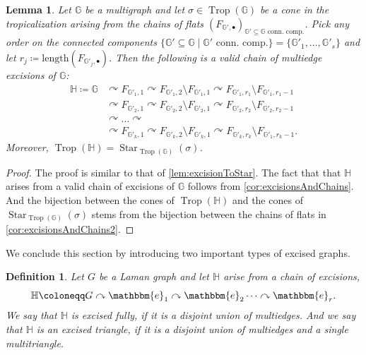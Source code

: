 \documentclass[11pt,reqno,a4paper]{amsart}
\theoremstyle{theoremstyle}
\newtheorem{lemma}[theorem]{Lemma}
\theoremstyle{examplestyle}
\newtheorem{definition}[theorem]{Definition}
\theoremstyle{algorithmstyle}
\newcommand{\ee}{\mathbbm{e}}
\newcommand{\GG}{\mathbb{G}}
\newcommand{\HH}{\mathbb{H}}
\DeclareMathOperator{\Trop}{Trop}
\DeclareMathOperator{\Star}{Star}
\begin{document}
\begin{lemma}
  \label{lem:starToExcision}
  Let $\GG$ be a multigraph and let $\sigma\in\Trop(\GG)$ be a cone in the tropicalization arising from the chains of flats $(F_{\GG',\bullet})_{\GG'\subseteq\GG \text{ conn. comp.}}$.  Pick any order on the connected components $\{\GG'\subseteq\GG \mid \GG' \text{ conn. comp.}\} = \{\GG'_1,\dots,\GG'_s\}$ and let $r_j\coloneqq\mathrm{length}(F_{\GG'_j,\bullet})$.  Then the following is a valid chain of multiedge excisions of $\GG$:
  \begin{align*}
    \HH\coloneqq \GG &\curvearrowright F_{\GG'_1,1} \curvearrowright F_{\GG'_1,2}\setminus F_{\GG'_1,1} \curvearrowright F_{\GG'_1,r_1}\setminus F_{\GG'_1,r_1-1}\\
                     &\curvearrowright F_{\GG'_2,1} \curvearrowright F_{\GG'_2,2}\setminus F_{\GG'_2,1} \curvearrowright F_{\GG'_2,r_2}\setminus F_{\GG'_2,r_2-1}\\
    &\curvearrowright \dots\curvearrowright \\
                     &\curvearrowright F_{\GG'_k,1} \curvearrowright F_{\GG'_k,2}\setminus F_{\GG'_k,1} \curvearrowright F_{\GG'_k,r_k}\setminus F_{\GG'_1,r_k-1}.
  \end{align*}
  Moreover, $\Trop(\HH)=\Star_{\Trop(\GG)}(\sigma)$.
\end{lemma}
\begin{proof}
  The proof is similar to that of \cref{lem:excisionToStar}.  The fact that that $\HH$ arises from a valid chain of excisions of $\GG$ follows from \cref{cor:excisionsAndChains}.  And the bijection between the cones of $\Trop(\HH)$ and the cones of $\Star_{\Trop(\GG)}(\sigma)$ stems from the bijection between the chains of flats in \cref{cor:excisionsAndChains2}.
\end{proof}

We conclude this section by introducing two important types of excised graphs.

\begin{definition}
  \label{def:excisionTriangle}
  Let $G$ be a Laman graph and let $\HH$ arise from a chain of excisions,
  \begin{equation*}
    \HH\coloneqq G\curvearrowright\ee_1\curvearrowright\ee_2\dots\curvearrowright\ee_r.
  \end{equation*}
  We say that $\HH$ is \emph{excised fully}, if it is a disjoint union of multiedges.  And we say that $\HH$ is an \emph{excised triangle}, if it is a disjoint union of multiedges and a single multitriangle.
\end{definition}
\end{document}
